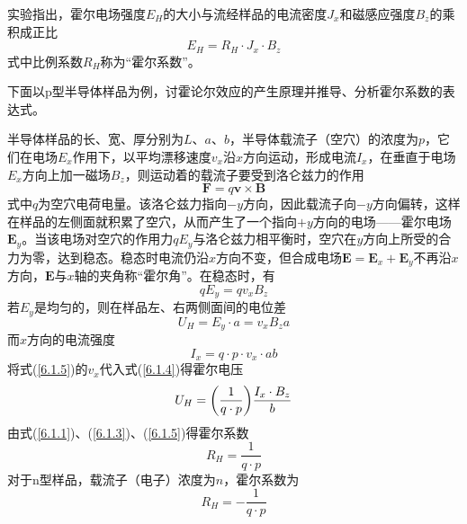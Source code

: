 \documentclass[a4paper]{article}
\begin{document}
实验指出，霍尔电场强度$E_H$的大小与流经样品的电流密度$J_x$和磁感应强度$B_z$的乘积成正比
\begin{equation}\label{6.1.1}
E_H=R_H \cdot J_x \cdot B_z 
\end{equation}
式中比例系数$R_H$称为“霍尔系数”。

下面以p型半导体样品为例，讨霍论尔效应的产生原理并推导、分析霍尔系数的表达式。

半导体样品的长、宽、厚分别为$L$、$a$、$b$，半导体载流子（空穴）的浓度为$p$，它们在电场$E_x$作用下，以平均漂移速度$v_x$沿$x$方向运动，形成电流$I_x$，在垂直于电场$E_x$方向上加一磁场$B_z$，则运动着的载流子要受到洛仑兹力的作用
\begin{equation}\label{6.1.2}
\bm{F}=q\bm{v} \times \bm{B}
\end{equation}
式中$q$为空穴电荷电量。该洛仑兹力指向$-y$方向，因此载流子向$-y$方向偏转，这样在样品的左侧面就积累了空穴，从而产生了一个指向$+y$方向的电场——霍尔电场$\bm{E}_y$。当该电场对空穴的作用力$q E_y$与洛仑兹力相平衡时，空穴在$y$方向上所受的合力为零，达到稳态。稳态时电流仍沿$x$方向不变，但合成电场$\bm{E}=\bm{E}_x+\bm{E}_y$不再沿$x$方向，$\bm{E}$与$x$轴的夹角称“霍尔角”。在稳态时，有
\begin{equation}\label{6.1.3}
qE_y=qv_x B_z
\end{equation}
若$E_y$是均匀的，则在样品左、右两侧面间的电位差
\begin{equation}\label{6.1.4}
U_H=E_y\cdot a=v_x B_z a
\end{equation}
而$x$方向的电流强度
\begin{equation}\label{6.1.5}
I_x=q\cdot p\cdot v_x\cdot ab
\end{equation}
将式(\ref{6.1.5})的$v_x$代入式(\ref{6.1.4})得霍尔电压
\begin{equation}\label{6.1.6}
U_H=\qty(\frac{1}{q\cdot p})\frac{I_x\cdot B_z}{b}
\end{equation}
由式(\ref{6.1.1})、(\ref{6.1.3})、(\ref{6.1.5})得霍尔系数
\begin{equation}\label{6.1.7}
R_H=\frac{1}{q\cdot p}
\end{equation}
对于n型样品，载流子（电子）浓度为$n$，霍尔系数为
\begin{equation}\label{6.1.8}
R_H=-\frac{1}{q\cdot p}
\end{equation}
\end{document}
